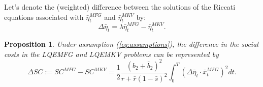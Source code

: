 \documentclass[11pt]{article}
\newtheorem{proposition}{Proposition}
\begin{document}
Let's denote the (weighted) difference between the solutions of the Riccati equations associated with $\bar{\eta}_t^{MFG}$ and $\bar{\eta}_t^{MKV}$ by:
\begin{equation}
	\Delta \bar{\eta}_t = \lambda \bar{\eta}_t^{MFG} - \bar{\eta}_t^{MKV} .
\label{eq:delta_eta}
\end{equation} 

\begin{proposition}
	Under assumption (\ref{eq:assumptions}), the difference in the social costs in the LQEMFG and LQEMKV problems can be represented by
	\begin{equation*}
		\Delta SC := SC^{MFG} - SC^{MKV} =  \frac{1}{2} \frac{(b_2 + \bar{b}_2)^2}{r + \bar{r}(1-\bar{s})^2} \int_0^T (\Delta \bar{\eta}_t \cdot \bar{x}_t^{MFG})^2 dt.
	\end{equation*}
\label{prop:diff_SC}
\end{proposition}
\end{document}
